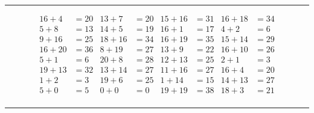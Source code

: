 \documentclass{article}
\begin{document}
\begin{sloppy}
\hrule
\begin{align*}
    {16} + {4} &= {20} & {13} + {7} &= {20} & {15} + {16} &= {31} & {16} + {18} &= {34} \\
    {5} + {8} &= {13} & {14} + {5} &= {19} & {16} + {1} &= {17} & {4} + {2} &= {6} \\
    {9} + {16} &= {25} & {18} + {16} &= {34} & {16} + {19} &= {35} & {15} + {14} &= {29} \\
    {16} + {20} &= {36} & {8} + {19} &= {27} & {13} + {9} &= {22} & {16} + {10} &= {26} \\
    {5} + {1} &= {6} & {20} + {8} &= {28} & {12} + {13} &= {25} & {2} + {1} &= {3} \\
    {19} + {13} &= {32} & {13} + {14} &= {27} & {11} + {16} &= {27} & {16} + {4} &= {20} \\
    {1} + {2} &= {3} & {19} + {6} &= {25} & {1} + {14} &= {15} & {14} + {13} &= {27} \\
    {5} + {0} &= {5} & {0} + {0} &= {0} & {19} + {19} &= {38} & {18} + {3} &= {21} \\
\end{align*}
\hrule
\end{sloppy}
\end{document}
